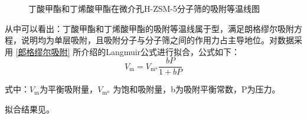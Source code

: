 \begin{figure}[H]
    \caption{丁酸甲酯和丁烯酸甲酯在微介孔H-ZSM-5分子筛的吸附等温线图}
    \label{fig:sA}
\end{figure}


\par{从中可以看出：丁酸甲酯和丁烯酸甲酯的吸附等温线属于\uppercase\expandafter{}型，满足朗格缪尔吸附方程，说明均为单层吸附，且吸附分子与分子筛之间的作用力占主导地位。对数据采用 \ref{郎格缪尔吸附} 所介绍的Langmuir公式进行拟合，公式如下：}
\begin{equation}
    V_{\mathrm{m}}=V_{\mathrm{m}^{\mathrm{a}}} \frac{b P}{1+b P}
\end{equation}
\par{式中：$V_{\mathrm{m}}$为平衡吸附量，$V_{\mathrm{m}^{a}}$ 为饱和吸附量，b为吸附平衡常数，P为压力。}
\par{拟合结果见。}

